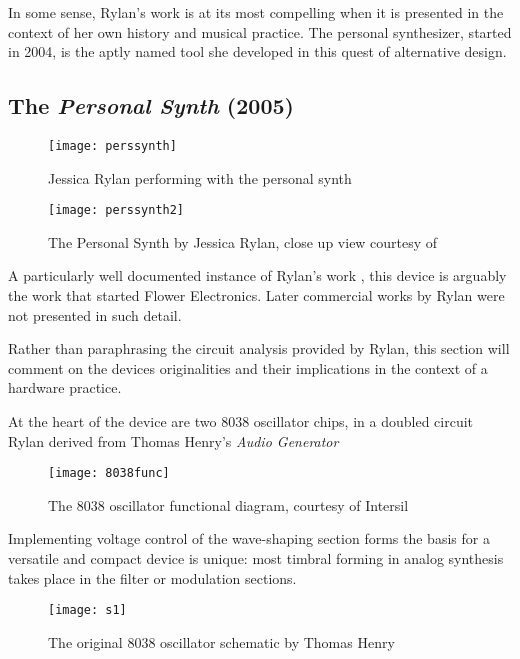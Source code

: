 In some sense, Rylan's work is at its most compelling when it is presented in the context of her own history and musical practice. The personal synthesizer, started in 2004, is the aptly named tool she developed in this quest of alternative design. 

\subsection{The \textit{Personal Synth} (2005)}

	\begin{figure}[H]
	  \centering
	    \texttt{[image: perssynth]}
	    \caption{Jessica Rylan performing with the personal synth}
	\end{figure}
	
	\begin{figure}[H]
	  \centering
	    \texttt{[image: perssynth2]}
	    \caption{The Personal Synth by Jessica Rylan, close up view courtesy of \citep{rylan2011}}
	\end{figure}
	
A particularly well documented instance of Rylan's work \citep{rylan2011}, this device is arguably the work that started Flower Electronics. Later commercial works by Rylan were not presented in such detail. 
	
Rather than paraphrasing the circuit analysis provided by Rylan, this section will comment on the devices originalities and their implications in the context of a hardware practice. 
	
At the heart of the device are two 8038 oscillator chips, in a doubled circuit Rylan derived from Thomas Henry's \emph{Audio Generator} \citep{rylan2011, henry} 

\begin{figure}[H]
	  \centering
	    \texttt{[image: 8038func]}
	    \caption{The 8038 oscillator functional diagram, courtesy of Intersil}
	\end{figure}

Implementing voltage control of the wave-shaping section forms the basis for a versatile and compact device is unique: most timbral forming in analog synthesis takes place in the filter or modulation sections. 

\begin{figure}[H]
	  \centering
	    \texttt{[image: s1]}
	    \caption{The original 8038 oscillator schematic by Thomas Henry\citep{Henry}}
	\end{figure}
	
